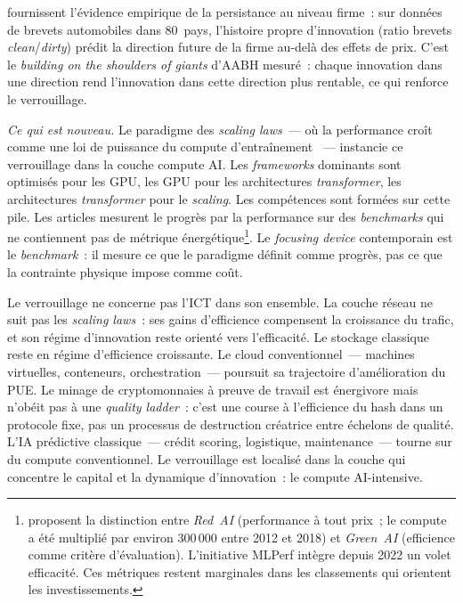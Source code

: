\textcite{aghion_carbon_2016} fournissent l'évidence empirique de la persistance au niveau firme~: sur données de brevets automobiles dans 80~pays, l'histoire propre d'innovation (ratio brevets \emph{clean}/\emph{dirty}) prédit la direction future de la firme au-delà des effets de prix. C'est le \og \emph{building on the shoulders of giants}\fg{} d'AABH mesuré~: chaque innovation dans une direction rend l'innovation dans cette direction plus rentable, ce qui renforce le verrouillage.

\emph{Ce qui est nouveau.} Le paradigme des \emph{scaling laws}~--- où la performance croît comme une loi de puissance du compute d'entraînement \parencite{kaplan_scaling_2020,hoffmann_training_2022}~--- instancie ce verrouillage dans la couche compute AI. Les \emph{frameworks} dominants sont optimisés pour les GPU, les GPU pour les architectures \emph{transformer}, les architectures \emph{transformer} pour le \emph{scaling}. Les compétences sont formées sur cette pile. Les articles mesurent le progrès par la performance sur des \emph{benchmarks} qui ne contiennent pas de métrique énergétique\footnote{\textcite{schwartz_green_2020} proposent la distinction entre \emph{Red~AI} (performance à tout prix~; le compute a été multiplié par environ 300\,000 entre 2012 et 2018) et \emph{Green~AI} (efficience comme critère d'évaluation). L'initiative MLPerf intègre depuis 2022 un volet efficacité. Ces métriques restent marginales dans les classements qui orientent les investissements.}. Le \emph{focusing device} contemporain est le \emph{benchmark}~: il mesure ce que le paradigme définit comme progrès, pas ce que la contrainte physique impose comme coût.

Le verrouillage ne concerne pas l'ICT dans son ensemble. La couche réseau ne suit pas les \emph{scaling laws}~: ses gains d'efficience compensent la croissance du trafic, et son régime d'innovation reste orienté vers l'efficacité. Le stockage classique reste en régime d'efficience croissante. Le cloud conventionnel~--- machines virtuelles, conteneurs, orchestration~--- poursuit sa trajectoire d'amélioration du PUE. Le minage de cryptomonnaies à preuve de travail est énergivore mais n'obéit pas à une \emph{quality ladder}~: c'est une course à l'efficience du hash dans un protocole fixe, pas un processus de destruction créatrice entre échelons de qualité. L'IA prédictive classique~--- crédit scoring, logistique, maintenance~--- tourne sur du compute conventionnel. Le verrouillage est localisé dans la couche qui concentre le capital et la dynamique d'innovation~: le compute AI-intensive.

